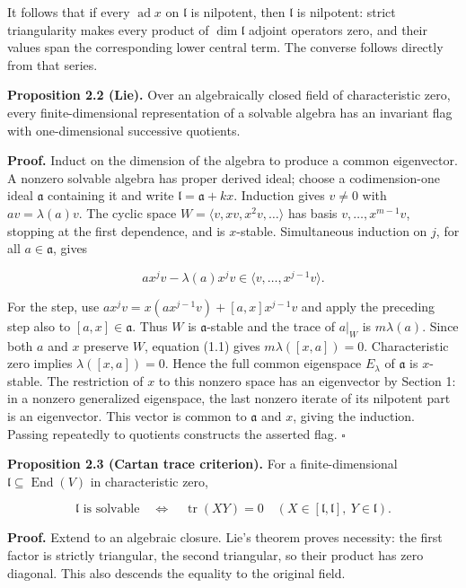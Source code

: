 \documentclass[11pt,a4paper,openany]{report}
\begin{document}
It follows that if every \(\operatorname{ad}x\) on \(\mathfrak l\) is nilpotent, then \(\mathfrak l\) is nilpotent: strict triangularity makes every product of \(\dim\mathfrak l\) adjoint operators zero, and their values span the corresponding lower central term. The converse follows directly from that series.

\textbf{Proposition 2.2 (Lie).} Over an algebraically closed field of characteristic zero, every finite-dimensional representation of a solvable algebra has an invariant flag with one-dimensional successive quotients.

\textbf{Proof.} Induct on the dimension of the algebra to produce a common eigenvector. A nonzero solvable algebra has proper derived ideal; choose a codimension-one ideal \(\mathfrak a\) containing it and write \(\mathfrak l=\mathfrak a+kx\). Induction gives \(v\ne0\) with \(av=\lambda(a)v\). The cyclic space \(W=\langle v,xv,x^2v,\ldots\rangle\) has basis \(v,\ldots,x^{m-1}v\), stopping at the first dependence, and is \(x\)-stable. Simultaneous induction on \(j\), for all \(a\in\mathfrak a\), gives

\[
ax^jv-\lambda(a)x^jv\in\langle v,\ldots,x^{j-1}v\rangle.
\tag{2.1}
\]

For the step, use \(ax^jv=x(ax^{j-1}v)+[a,x]x^{j-1}v\) and apply the preceding step also to \([a,x]\in\mathfrak a\). Thus \(W\) is \(\mathfrak a\)-stable and the trace of \(a|_W\) is \(m\lambda(a)\). Since both \(a\) and \(x\) preserve \(W\), equation (1.1) gives \(m\lambda([x,a])=0\). Characteristic zero implies \(\lambda([x,a])=0\). Hence the full common eigenspace \(E_\lambda\) of \(\mathfrak a\) is \(x\)-stable. The restriction of \(x\) to this nonzero space has an eigenvector by Section 1: in a nonzero generalized eigenspace, the last nonzero iterate of its nilpotent part is an eigenvector. This vector is common to \(\mathfrak a\) and \(x\), giving the induction. Passing repeatedly to quotients constructs the asserted flag. \(\square\)

\textbf{Proposition 2.3 (Cartan trace criterion).} For a finite-dimensional \(\mathfrak l\subseteq\operatorname{End}(V)\) in characteristic zero,

\[
\mathfrak l\text{ is solvable}
\quad\Longleftrightarrow\quad
\operatorname{tr}(XY)=0
\quad(X\in[\mathfrak l,\mathfrak l],\ Y\in\mathfrak l).
\tag{2.2}
\]

\textbf{Proof.} Extend to an algebraic closure. Lie's theorem proves necessity: the first factor is strictly triangular, the second triangular, so their product has zero diagonal. This also descends the equality to the original field.
\end{document}
